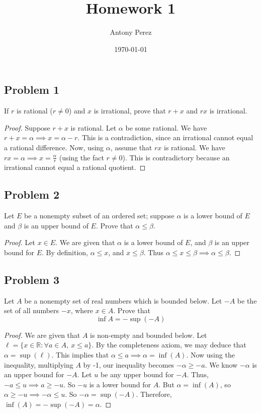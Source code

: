 \documentclass{amsart}
\title{Homework 1}
\author{Antony Perez}
\date{\today}
\begin{document}
\maketitle
\subsection*{Problem 1} If $r$ is rational ($r \neq 0$) and $x$ is irrational, prove that $r+x$ and $rx$ is irrational. 
\begin{proof}
    Suppose $r+x$ is rational. Let $\alpha$ be some rational. We have $r+x = \alpha \implies x = \alpha - r$. This is a contradiction, since an irrational cannot equal a rational difference. Now, using $\alpha$, assume that $rx$ is rational. We have $rx = \alpha \implies x = \frac{\alpha}{r}$ (using the fact $r \neq 0 $). This is contradictory because an irrational cannot equal a rational quotient. 
\end{proof}
\subsection*{Problem 2} Let $E$ be a nonempty subset of an ordered set; suppose $\alpha$ is a lower bound of $E$ and $\beta$ is an upper bound of $E$. Prove that $\alpha \leq \beta$.
\begin{proof}
    Let $x \in E$. We are given that $\alpha$ is a lower bound of $E$, and $\beta$ is an upper bound for $E$. By definition, $\alpha \leq x $, and $x \leq \beta $. Thus $\alpha \leq x \leq \beta \implies \alpha \leq \beta$.  
\end{proof}
\subsection*{Problem 3} Let $A$ be a nonempty set of real numbers which is bounded below. Let $-A$ be the set of all numbers $-x$, where $x \in A$. Prove that \[\inf A = - \sup (-A)\]
\begin{proof}
    We are given that $A$ is non-empty and bounded below. Let $\ell = \{x \in \mathbb{R} : \forall a \in A, \ x \leq a\}$. 
    By the completeness axiom, we may deduce that $\alpha = \sup(\ell)$. This implies that $\alpha \leq a \implies \alpha = \inf (A)$. Now using the inequality, multiplying $A$ by -1, our inequality becomes $-\alpha \geq -a $. 
    We know $-\alpha$ is an upper bound for $-A$. Let $u$ be any upper bound for $-A$. Thus, $-a \leq u \implies a \geq -u$. So $-u$ is a lower bound for $A$. But $\alpha = \inf(A)$, so $\alpha \geq -u \implies -\alpha \leq u$. So $-\alpha=\sup(-A)$.
    Therefore, $\inf(A)=-\sup(-A)=\alpha$.
\end{proof}
\end{document}
